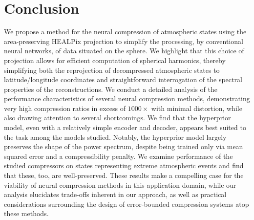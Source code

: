 \section{Conclusion}
\label{sx:conclusion}

We propose a method for the neural compression of atmospheric states using the area-preserving HEALPix projection to simplify the processing, by conventional neural networks, of data situated on the sphere. We highlight that this choice of projection allows for efficient computation of spherical harmonics, thereby simplifying both the reprojection of decompressed atmospheric states to latitude/longitude coordinates and straightforward interrogation of the spectral properties of the reconstructions.
We conduct a detailed analysis of the performance characteristics of several neural compression methods, demonstrating very high compression ratios in excess of $1000\times$ with minimal distortion, while also drawing attention to several shortcomings.
We find that the hyperprior model, even with a relatively simple encoder and decoder, appears best suited to the task among the models studied.
Notably, the hyperprior model largely preserves the shape of the power spectrum, despite being trained only via mean squared error and a compressibility penalty.
We examine performance of the studied compressors on states representing extreme atmospheric events and find that these, too, are well-preserved.
These results make a compelling case for the viability of neural compression methods in this application domain, while our analysis elucidates trade-offs inherent in our approach, as well as practical considerations surrounding the design of error-bounded compression systems atop these methods.



